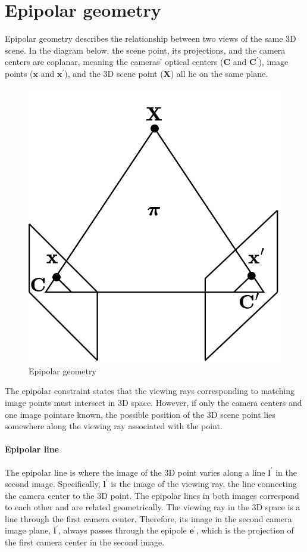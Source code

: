 \section{Epipolar geometry}

Epipolar geometry describes the relationship between two views of the same 3D scene. 
In the diagram below, the scene point, its projections, and the camera centers are coplanar, meaning the cameras' optical centers ($\mathbf{C}$ and $\mathbf{C}^\prime$), image points ($\mathbf{x}$ and $\mathbf{x}^\prime$), and the 3D scene point ($\mathbf{X}$) all lie on the same plane.
\begin{figure}[H]
    \centering
    \includegraphics[width=0.5\linewidth]{images/epi.png}
    \caption{Epipolar geometry}
\end{figure}
The epipolar constraint states that the viewing rays corresponding to matching image points must intersect in 3D space. 
However, if only the camera centers and one image pointare known, the possible position of the 3D scene point lies somewhere along the viewing ray associated with the point. 

\paragraph*{Epipolar line}
The epipolar line is where the image of the 3D point varies along a line $\mathbf{l}^\prime$ in the second image.
Specifically, $\mathbf{l}^\prime$ is the image of the viewing ray, the line connecting the camera center to the 3D point.
The epipolar lines in both images correspond to each other and are related geometrically.
The viewing ray in the 3D space is a line through the first camera center. 
Therefore, its image in the second camera image plane, $\mathbf{l}^\prime$, always passes through the epipole $\mathbf{e}^\prime$, which is the projection of the first camera center in the second image.

